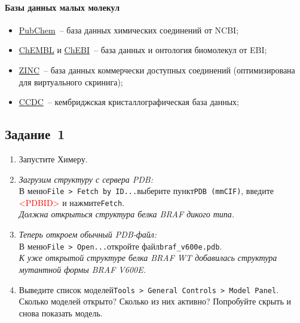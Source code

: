 \paragraph{Базы данных малых молекул}
\begin{itemize}
    \item \href{https://pubchem.ncbi.nlm.nih.gov/}{PubChem}~-- база данных химических соединений от NCBI;
    \item \href{https://www.ebi.ac.uk/chembl/}{ChEMBL} и \href{https://www.ebi.ac.uk/chebi/}{ChEBI}~-- база данных и онтология биомолекул от EBI;
    \item \href{http://zinc15.docking.org}{ZINC}~-- база данных коммерчески доступных соединений (оптимизирована для виртуального скринига);
    \item \href{https://www.ccdc.cam.ac.uk}{CCDC}~-- кембриджская кристаллографическая база данных;
\end{itemize}

\subsection*{Задание~1}
\begin{enumerate}
    \item Запустите Химеру.
    
    \item \textit{Загрузим структуру с сервера PDB:}\\
        В меню\quad\texttt{File~> Fetch by ID...}\quad выберите пункт\quad\texttt{PDB (mmCIF)}, введите
        \textcolor{red}{<PDBID>} %
        и нажмите\quad\texttt{Fetch}.\\
        \textit{Должна открыться структура белка BRAF дикого типа.}
    
    \item \textit{Теперь откроем обычный PDB-файл:}\\
        В меню\quad\texttt{File~> Open...}\quad откройте файл\quad\texttt{braf\_v600e.pdb}.\\
        \textit{К уже открытой структуре белка BRAF WT добавилась структура мутантной формы BRAF V600E.}
        
    \item Выведите список моделей\quad\texttt{Tools~> General Controls~> Model Panel}.\\
        Сколько моделей открыто? Сколько из них активно? Попробуйте скрыть и снова показать модель.
\end{enumerate}
